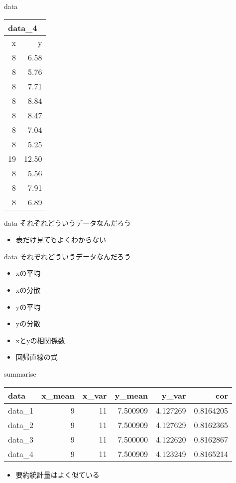 \documentclass[
  ignorenonframetext,
]{beamer}
\providecommand{\tightlist}{%
  \setlength{\itemsep}{0pt}\setlength{\parskip}{0pt}}
\begin{document}
\begin{frame}{data}
\begin{tabular}{rr}
\multicolumn{2}{l}{data\_4}\\
\toprule
x & y\\
\midrule
8 & 6.58\\
8 & 5.76\\
8 & 7.71\\
8 & 8.84\\
8 & 8.47\\
8 & 7.04\\
8 & 5.25\\
19 & 12.50\\
8 & 5.56\\
8 & 7.91\\
8 & 6.89\\
\bottomrule
\end{tabular}
\end{frame}

\begin{frame}{data}
\protect\hypertarget{data-2}{}
それぞれどういうデータなんだろう

\begin{itemize}[<+->]
\tightlist
\item
  表だけ見てもよくわからない
\end{itemize}
\end{frame}

\begin{frame}{data}
\protect\hypertarget{data-3}{}
それぞれどういうデータなんだろう

\begin{itemize}[<+->]
\tightlist
\item
  xの平均
\item
  xの分散
\item
  yの平均
\item
  yの分散
\item
  xとyの相関係数
\item
  回帰直線の式
\end{itemize}
\end{frame}

\begin{frame}{summarise}
\protect\hypertarget{summarise}{}
\begin{longtable}[]{@{}lrrrrr@{}}
\toprule()
data & x\_mean & x\_var & y\_mean & y\_var & cor \\
\midrule()
\endhead
data\_1 & 9 & 11 & 7.500909 & 4.127269 & 0.8164205 \\
data\_2 & 9 & 11 & 7.500909 & 4.127629 & 0.8162365 \\
data\_3 & 9 & 11 & 7.500000 & 4.122620 & 0.8162867 \\
data\_4 & 9 & 11 & 7.500909 & 4.123249 & 0.8165214 \\
\bottomrule()
\end{longtable}

\begin{itemize}
\tightlist
\item
  要約統計量はよく似ている
\end{itemize}
\end{frame}
\end{document}
